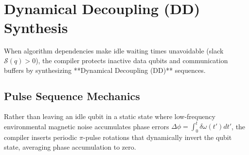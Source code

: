 \section{Dynamical Decoupling (DD) Synthesis}
\label{sec:dynamical_decoupling}

When algorithm dependencies make idle waiting times unavoidable (slack $\mathcal{S}(q) > 0$), the compiler protects inactive data qubits and communication buffers by synthesizing **Dynamical Decoupling (DD)** sequences.

\subsection{Pulse Sequence Mechanics}
Rather than leaving an idle qubit in a static state where low-frequency environmental magnetic noise accumulates phase errors $\Delta \phi = \int_0^t \delta \omega(t') dt'$, the compiler inserts periodic $\pi$-pulse rotations that dynamically invert the qubit state, averaging phase accumulation to zero.

